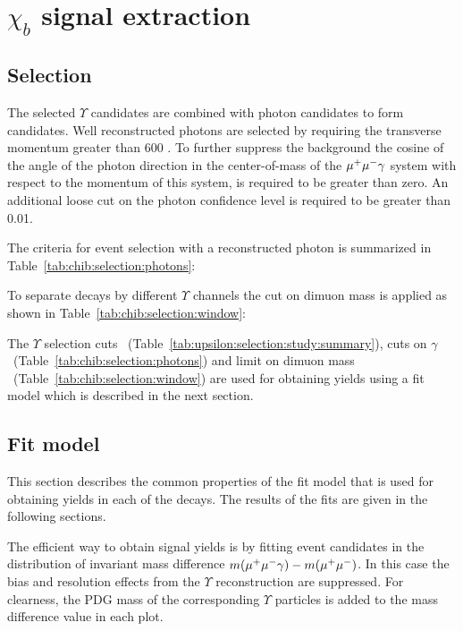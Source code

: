\section{\texorpdfstring{$\chi_b$}{xb} signal extraction}
\label{sec:chib}

\subsection{Selection}
\label{sec:chib:selection}

The selected $\Upsilon$ candidates  are combined with photon candidates to form
\chib candidates. Well reconstructed photons are selected by requiring the
transverse momentum greater than 600 \mevc. To further suppress the background
the cosine of the angle of the photon direction in the center-of-mass of the
$\mu^+\mu^-\gamma$ system with respect to the momentum of this system, is required to
be greater than zero. An additional loose cut on the photon confidence level is
required to be greater than 0.01.

The criteria for event selection with a reconstructed photon is summarized in
Table~\ref{tab:chib:selection:photons}:



To separate decays by different $\Upsilon$ channels the cut on dimuon mass is
applied as shown in Table~\ref{tab:chib:selection:window}:



The $\Upsilon$ selection cuts
~(Table~\ref{tab:upsilon:selection:study:summary}), cuts  on $\gamma$
~(Table~\ref{tab:chib:selection:photons}) and limit on dimuon mass
~(Table~\ref{tab:chib:selection:window}) are used for obtaining \chib yields
using a fit model which is described in the next section.


\subsection{Fit model}
\label{sec:chib:fit}

This section describes the common properties of the fit model that is used for
obtaining yields in each of the \chib decays. The results of the fits are
given in the following sections.

The efficient way to obtain \chib signal yields is by fitting event candidates
in the distribution of invariant mass difference $m(\mu^+\mu^-\gamma) - m(\mu^+\mu^-)$.
In this case the bias and resolution effects from the $\Upsilon$ reconstruction
are suppressed. For clearness, the PDG mass of the corresponding $\Upsilon$
particles is added to the mass difference value in each plot.

